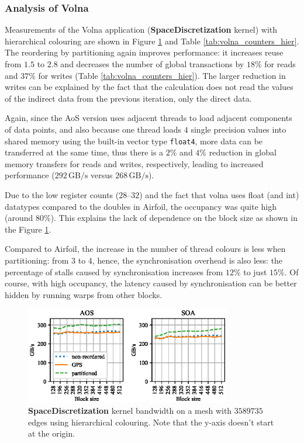 \subsubsection{Analysis of Volna}

Measurements of the Volna application (\textbf{SpaceDiscretization} kernel)
with hierarchical colouring are shown in Figure \ref{fig:volna_bw-vs-bs_hier}  
and Table \ref{tab:volna_counters_hier}. The
reordering by partitioning again improves performance: it increases reuse from
$1.5$ to $2.8$ and decreases the number of global transactions by $18\%$ for
reads and $37\%$ for writes (Table \ref{tab:volna_counters_hier}). The larger
reduction in writes can be explained by the fact that the calculation does not
read the values of the indirect data from the previous iteration, only the
direct data.

Again, since the AoS version uses adjacent threads to load adjacent components
of data points, and also because one thread loads $4$ single precision values
into shared memory using the built-in vector type \lstinline!float4!, more data
can be transferred at the same time, thus there is a $2\%$ and $4\%$ reduction
in global memory transfers for reads and writes, respectively, leading to
increased performance ($292\,\text{GB/s}$ versus $268\,\text{GB/s}$).

Due to the low register counts ($28$--$32$) and the fact that volna uses float
(and int) datatypes compared to the doubles in Airfoil, the occupancy was quite
high (around $80\%$).  This explains the lack of dependence on the block size as
shown in the Figure \ref{fig:volna_bw-vs-bs_hier}.

Compared to Airfoil, the increase in the number of thread colours is less when
partitioning: from $3$ to $4$, hence, the synchronisation overhead is also less:
the percentage of stalls caused by synchronisation increases from $12\%$ to just
$15\%$. Of course, with high occupancy, the latency caused by synchronisation
can be better hidden by running warps from other blocks.


\begin{figure}[Htbp]
  \centering
  \includegraphics[width=9cm]{fig/volna_bw-vs-bs_hier.eps}
  \caption{\textbf{SpaceDiscretization} kernel bandwidth on a mesh with
  $3589735$ edges using hierarchical colouring. Note that the y-axis doesn't
  start at the origin.}
  \label{fig:volna_bw-vs-bs_hier}
\end{figure}

